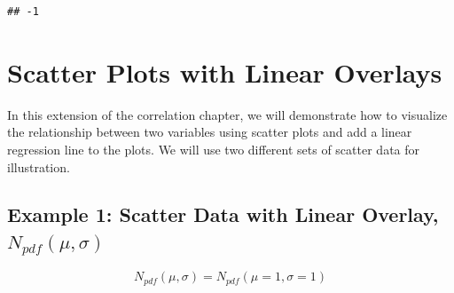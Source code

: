 \documentclass[
  12 pt,
  a4paper,
]{book}
\numberwithin{equation}{section}
\theoremstyle{plain}      %
\theoremstyle{definition} %
\theoremstyle{remark}     %
\theoremstyle{note}         %
\begin{document}
\begin{verbatim}
## -1
\end{verbatim}

\normalsize

\newpage

\hypertarget{scatter-plots-with-linear-overlays}{%
\section{Scatter Plots with Linear
Overlays}\label{scatter-plots-with-linear-overlays}}

In this extension of the correlation chapter, we will demonstrate how to
visualize the relationship between two variables using scatter plots and
add a linear regression line to the plots. We will use two different
sets of scatter data for illustration.

\hypertarget{example-1-scatter-data-with-linear-overlay-n_pdfmu-sigma}{%
\subsection{\texorpdfstring{Example 1: Scatter Data with Linear Overlay,
\(N_{pdf}(\mu, \sigma)\)}{Example 1: Scatter Data with Linear Overlay, N\_\{pdf\}(\textbackslash mu, \textbackslash sigma)}}\label{example-1-scatter-data-with-linear-overlay-n_pdfmu-sigma}}

\[
N_{pdf}(\mu,\sigma) = N_{pdf}(\mu=1,\sigma=1)
\]

\scriptsize
\end{document}
